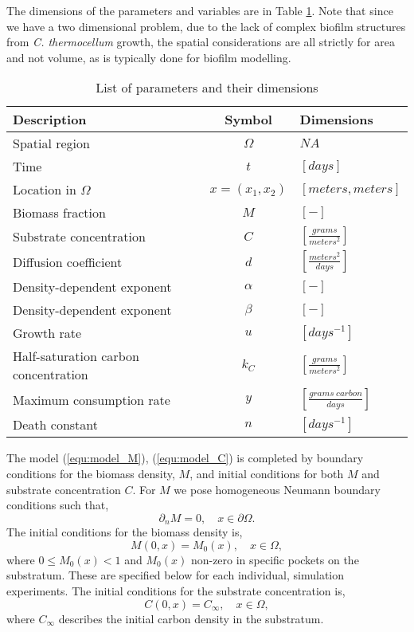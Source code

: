  
The dimensions of the parameters and variables are in Table \ref{tab:varDimensions}.
Note that since we have a two dimensional problem, due to the lack of complex biofilm structures from \textit{C. thermocellum} growth, the spatial considerations are all strictly for area and not volume, as is typically done for biofilm modelling.
  \begin{table}[!hbt]
    \centering
    \begin{tabular}{|l |c |l |}
      \hline 
      Description & Symbol & Dimensions \\
      \hline
      \hline
      Spatial region & $\Omega$ &  $NA$ \\
      \hline 
      Time & $t$ & $\left[days\right]$ \\
      Location in $\Omega$ & $x=(x_1,x_2)$ & $\left[meters, meters\right]$ \\
      \hline
      Biomass fraction & $M$ & $\left[-\right]$ \\
      Substrate concentration & $C$ & $\left[\frac{grams}{meters^2}\right]$ \\
      \hline
      Diffusion coefficient & $d$ & $\left[\frac{meters^2}{days}\right]$ \\
      Density-dependent exponent & $ \alpha $ & $\left[-\right]$  \\
      Density-dependent exponent & $ \beta  $ & $\left[-\right]$  \\
      Growth rate & $ u $ & $\left[days^{-1} \right]$ \\
      Half-saturation carbon concentration & $ k_C $ & $\left[\frac{grams}{meters^2}\right]$ \\
      Maximum consumption rate & $y$ & $\left[\frac{grams\ carbon}{days}\right]$  \\
      Death constant & $n$& $\left[days^{-1} \right]$ \\
      \hline
    \end{tabular}
    \caption{List of parameters and their dimensions}
        \label{tab:varDimensions}
  \end{table}

The model (\ref{equ:model_M}), (\ref{equ:model_C}) is completed by boundary conditions for the biomass density, $M$, and initial conditions for both $M$ and substrate concentration $C$.
For $M$ we pose homogeneous Neumann boundary conditions such that,
\begin{equation} 
  \partial_n M = 0, \quad x \in \partial \Omega.
\end{equation}
The initial conditions for the biomass density is,
\begin{equation}
  M(0,x) = M_0(x), \quad x \in \Omega,
\end{equation}
where $0 \le M_0(x) < 1$ and $M_0(x)$ non-zero in specific pockets on the substratum. 
These are specified below for each individual, simulation experiments.
The initial conditions for the substrate concentration is,
\begin{equation}
  C(0,x) = C_{\infty}, \quad x \in \Omega,
\end{equation}
where $C_{\infty}$ describes the initial carbon density in the substratum.

